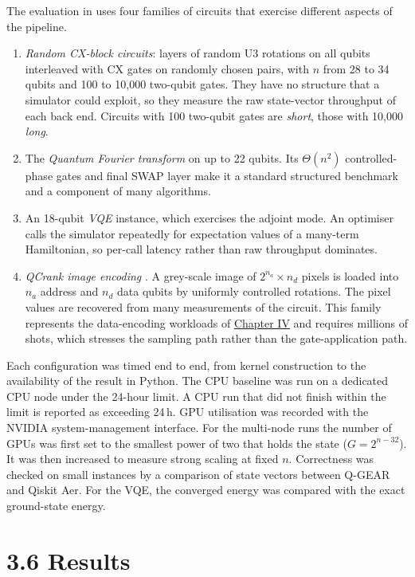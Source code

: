 \documentclass{report}
\theoremstyle{plain}
\theoremstyle{definition}
\theoremstyle{remark}
\begin{document}
The evaluation in \cite{guo2025qgear} uses four families of circuits that exercise different aspects of the pipeline.
\begin{enumerate}
  \item \emph{Random CX-block circuits}: layers of random U3 rotations on all qubits interleaved with CX gates on randomly chosen pairs, with $n$ from 28 to 34 qubits and 100 to 10,000 two-qubit gates. They have no structure that a simulator could exploit, so they measure the raw state-vector throughput of each back end. Circuits with 100 two-qubit gates are \emph{short}, those with 10,000 \emph{long}.
  \item The \emph{Quantum Fourier transform} on up to 22 qubits. Its $\Theta(n^{2})$ controlled-phase gates and final SWAP layer make it a standard structured benchmark and a component of many algorithms.
  \item An 18-qubit \emph{VQE} instance, which exercises the adjoint mode. An optimiser calls the simulator repeatedly for expectation values of a many-term Hamiltonian, so per-call latency rather than raw throughput dominates.
  \item \emph{QCrank image encoding} \cite{balewski2024qcrank}. A grey-scale image of $2^{n_{a}}\times n_{d}$ pixels is loaded into $n_{a}$ address and $n_{d}$ data qubits by uniformly controlled rotations. The pixel values are recovered from many measurements of the circuit. This family represents the data-encoding workloads of \hyperref[ch:qml]{Chapter IV} and requires millions of shots, which stresses the sampling path rather than the gate-application path.
\end{enumerate}

Each configuration was timed end to end, from kernel construction to the availability of the result in Python. The CPU baseline was run on a dedicated CPU node under the 24-hour limit. A CPU run that did not finish within the limit is reported as exceeding 24 h. GPU utilisation was recorded with the NVIDIA system-management interface. For the multi-node runs the number of GPUs was first set to the smallest power of two that holds the state ($G=2^{n-32}$). It was then increased to measure strong scaling at fixed $n$. Correctness was checked on small instances by a comparison of state vectors between Q-GEAR and Qiskit Aer. For the VQE, the converged energy was compared with the exact ground-state energy.

\section{3.6 Results}\label{sec:qgear:results}
\end{document}
